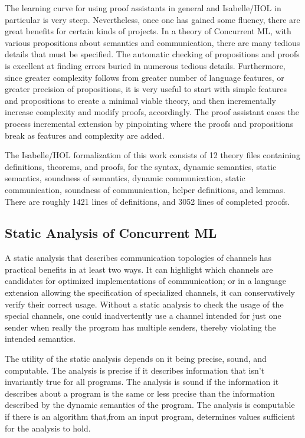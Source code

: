 \documentclass[letterpaper, 11pt]{report}
\begin{document}
The learning curve for using proof assistants in general and Isabelle/HOL in particular is very steep.
Nevertheless, once one has gained some fluency, there are great benefits for certain kinds of projects.
In a theory of Concurrent ML, with various propositions about semantics and communication, there are many
tedious details that must be specified. 
The automatic checking of propositions and proofs is excellent at finding errors buried in numerous tedious details.
Furthermore, since greater complexity follows from greater
number of language features, or greater precision of propositions, it is very useful to start with simple features
and propositions to create a minimal viable theory, and then incrementally increase complexity and modify proofs, accordingly.
The proof assistant eases the process incremental extension by pinpointing where the proofs and propositions break
as features and complexity are added.

The Isabelle/HOL formalization of this work consists of 12 theory files containing definitions, theorems,
and proofs, for the syntax, dynamic semantics, static semantics, soundness of semantics, dynamic communication,
static communication, soundness of communication, helper definitions, and lemmas. 
There are roughly 1421 lines of definitions, and 3052 lines of completed proofs. 

\subsection{Static Analysis of Concurrent ML}
A static analysis that describes communication
topologies of channels has practical benefits in at least two ways. It can highlight which
channels are candidates for optimized implementations of communication; or in a language
extension allowing the specification of specialized channels, it can conservatively verify
their correct usage. Without a static analysis to check the usage of the special channels, one
could inadvertently use a channel intended for just one sender when really the program has multiple senders, 
thereby violating the intended semantics. 

The utility of the static analysis depends on it being precise, sound, and computable. 
The analysis is precise if it describes information that isn't invariantly true for all programs. 
The analysis is sound if the information it describes about a program is the same or less precise than the information 
described by the dynamic semantics of the program. The analysis is computable if there is an algorithm that,from an input program, determines values sufficient for the analysis to hold.
\end{document}
